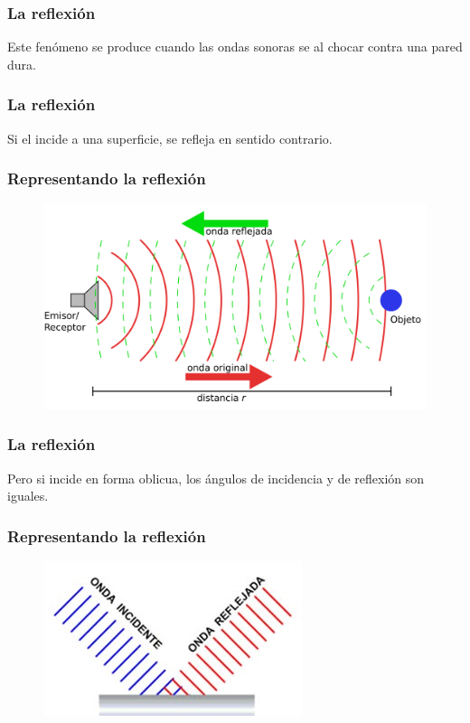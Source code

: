 \documentclass[14pt]{beamer}
\begin{document}
\begin{frame}
\frametitle{La reflexión}
Este fenómeno se produce cuando las ondas sonoras se  al chocar contra una pared dura.
\end{frame}
\begin{frame}
\frametitle{La reflexión}
Si el  incide  a una superficie, \pause se refleja en sentido contrario.
\end{frame}
\begin{frame}
\frametitle{Representando la reflexión}
\begin{figure}
    \centering
    \includegraphics[scale=0.2]{Imagenes/Acustica_01.png}
\end{figure}
\end{frame}
\begin{frame}
\frametitle{La reflexión}
Pero si incide en forma oblicua, los ángulos de incidencia y de reflexión son iguales.
\end{frame}
\begin{frame}
\frametitle{Representando la reflexión}
\begin{figure}
    \centering
    \includegraphics[scale=0.6]{Imagenes/Acustica_02.jpg}
\end{figure}
\end{frame}
\end{document}
